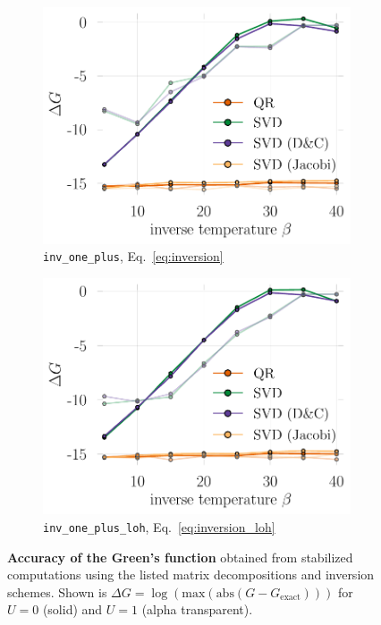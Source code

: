 \documentclass[submission, Phys]{SciPost}
\begin{document}
\begin{figure}
	\centering
	\begin{subfigure}{0.48\textwidth}
	\includegraphics[width=\textwidth]{figures/accuracy_greens_svd_regularinv.pdf}
\caption{\texttt{inv\_one\_plus}, Eq.~\eqref{eq:inversion} \label{fig:greens_accuracy_regularinv}}
	\end{subfigure}%
	\hspace{10pt}
	\begin{subfigure}{0.48\textwidth}
	\includegraphics[width=\textwidth]{figures/accuracy_greens_svd_loh.pdf}
\caption{\texttt{inv\_one\_plus\_loh}, Eq.~\ref{eq:inversion_loh} \label{fig:greens_accuracy_loh}}
	\end{subfigure}
	\vspace{5pt}
	\caption{\textbf{Accuracy of the Green's function} obtained from stabilized computations using the listed matrix decompositions and inversion schemes. Shown is ${\Delta G = \log(\textrm{max}(\textrm{abs}(G - G_{\textrm{exact}})))}$ for $U=0$ (solid) and $U=1$ (alpha transparent).}
\end{figure}
\end{document}
